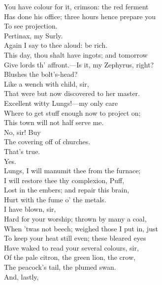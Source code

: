 \documentclass[a4paper,oneside,12pt]{memoir}
\begin{document}
\begin{drama*}
You have colour for it, crimson: the red ferment\\
Has done his office; three hours hence prepare you\\
To see projection.\\
\mammonspeaks {} Pertinax, my Surly.\\
Again I say to thee aloud: be rich.\\
This day, thou shalt have ingots; and tomorrow\\
Give lords th' affront.---Is it, my Zephyrus, right?\\
Blushes the bolt's-head?\\
\facespeaks {} Like a wench with child, sir,\\
That were but now discovered to her master.\\
\mammonspeaks Excellent witty Lungs!---my only care\\
Where to get stuff enough now to project on;\\
This town will not half serve me.\\
\facespeaks {} No, sir! Buy\\
The covering off of churches.\\
\mammonspeaks {} That's true.\\
\facespeaks {} Yes.\\
\mammonspeaks Lungs, I will manumit thee from the furnace;\\
I will restore thee thy complexion, Puff,\\
Lost in the embers; and repair this brain,\\
Hurt with the fume o' the metals.\\
\facespeaks {} I have blown, sir,\\
Hard for your worship; thrown by many a coal,\\
When 'twas not beech; weighed those I put in, just\\
To keep your heat still even; these bleared eyes\\
Have waked to read your several colours, sir,\\
Of the pale citron, the green lion, the crow,\\
The peacock's tail, the plumed swan.\\
\mammonspeaks {} And, lastly,\\

\end{drama*}
\end{document}
